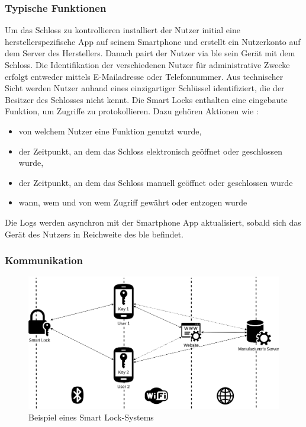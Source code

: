     \subsubsection{Typische Funktionen}
		Um das Schloss zu kontrollieren installiert der Nutzer initial eine herstellerspezifische App auf seinem Smartphone und erstellt ein Nutzerkonto auf dem Server des Herstellers. 
		Danach pairt der Nutzer via \gls{ble} sein Gerät mit dem Schloss.\cite{Ho2016} 
		Die Identifikation der verschiedenen Nutzer für administrative Zwecke erfolgt entweder mittels E-Mailadresse oder Telefonnummer. 
		Aus technischer Sicht werden Nutzer anhand eines einzigartiger Schlüssel identifiziert, die der Besitzer des Schlosses nicht kennt.\cite{Fuller2017} 
		Die Smart Locks enthalten eine eingebaute Funktion, um Zugriffe zu protokollieren. 
		Dazu gehören Aktionen wie \cite{Fuller2017}:
		\begin{itemize}[noitemsep]
			\item von welchem Nutzer eine Funktion genutzt wurde, 
			\item der Zeitpunkt, an dem das Schloss elektronisch geöffnet oder geschlossen wurde,
			\item der Zeitpunkt, an dem das Schloss manuell geöffnet oder geschlossen wurde
			\item wann, wem und von wem Zugriff gewährt oder entzogen wurde
		\end{itemize}
		Die Logs werden asynchron mit der Smartphone App aktualisiert, sobald sich das Gerät des Nutzers in Reichweite des \gls{ble} befindet\citeauthor{Ho2016}.
	
	\subsubsection{Kommunikation}
		\begin{figure}[H]
			\centering
			\includegraphics[width=\textwidth]{graphics/sl_arch.png}
			\caption{Beispiel eines Smart Lock-Systems}
			\label{fig:sl_arch}
		\end{figure}

